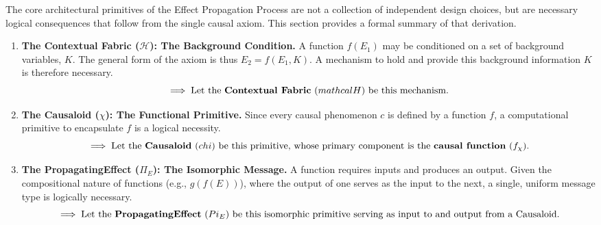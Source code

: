 The core architectural primitives of the Effect Propagation Process are not a collection of independent design choices, but are necessary logical consequences that follow from the single causal axiom. This section provides a formal summary of that derivation.

\begin{enumerate}
    \item \textbf{The Contextual Fabric ($\mathcal{H}$): The Background Condition.}\newline
    A function $f(E_1)$ may be conditioned on a set of background variables, $K$. The general form of the axiom is thus $E_2 = f(E_1, K)$.
    A mechanism to hold and provide this background information $K$ is therefore necessary.
    \begin{equation*}
        \implies \text{Let the \textbf{Contextual Fabric} ($\\mathcal{H}$) be this mechanism.}
    \end{equation*}

    \item \textbf{The Causaloid ($\chi$): The Functional Primitive.}\newline
    Since every causal phenomenon $c$ is defined by a function $f$, a computational primitive to encapsulate $f$ is a logical necessity.
    \begin{equation*}
        \implies \text{Let the \textbf{Causaloid} ($\\chi$) be this primitive, whose primary component is the \textbf{causal function} ($f_\chi$).}
    \end{equation*}

    \item \textbf{The PropagatingEffect ($\Pi_E$): The Isomorphic Message.}\newline
    A function requires inputs and produces an output. Given the compositional nature of functions (e.g., $g(f(E))$), where the output of one serves as the input to the next, a single, uniform message type is logically necessary.
    \begin{equation*}
        \implies \text{Let the \textbf{PropagatingEffect} ($\\Pi_E$) be this isomorphic primitive serving as input to and output from a Causaloid.}
    \end{equation*}


\end{enumerate}
